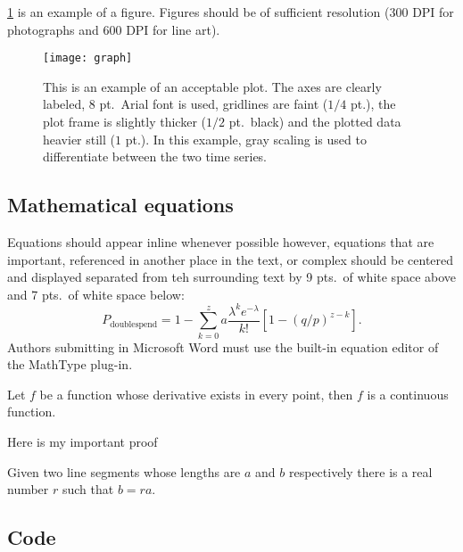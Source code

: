 \documentclass{ledger}
\begin{document}
\cref{fig:1} is an example of a figure.  Figures should be of sufficient resolution (300 DPI for photographs and 600 DPI for line art).

\begin{figure}[ht]
\centering
\texttt{[image: graph]}
\caption{This is an example of an acceptable plot.  The axes are clearly labeled, 8 pt.\ Arial font is used, gridlines are faint ($1/4$ pt.), the plot frame is slightly thicker ($1/2$ pt.\ black) and the plotted data heavier still ($1$ pt.).  In this example, gray scaling is used to differentiate between the two time series.}
\label{fig:1}
\end{figure}

\subsection{Mathematical equations}

Equations should appear inline whenever possible however, equations that are important, referenced in another place in the text, or complex should be centered and displayed separated from teh surrounding text by 9 pts.\ of white space above and 7 pts.\ of white space below:
\begin{equation}
P_{\text{doublespend}}=1-\sum _{k=0}^za\frac{\lambda ^ke^{-\lambda}}{k!}\left[ 1-(q/p)^{z-k}\right] .
\end{equation}
Authors submitting in Microsoft Word must use the built-in equation editor of the MathType plug-in.





\begin{theorem}
Let $f$ be a function whose derivative exists in every point, then $f$
is a continuous function.
\end{theorem}

\begin{myproof}
Here is my important proof
\end{myproof}

\begin{lemma}
Given two line segments whose lengths are $a$ and $b$ respectively there
is a real number $r$ such that $b=ra$.
\end{lemma}





\subsection{Code}
\end{document}
